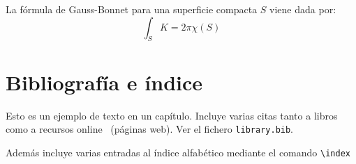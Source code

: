 La fórmula de Gauss-Bonnet para una superficie compacta $S$ viene dada por:
\begin{equation}
  \int_S K = 2\pi\chi(S)
\end{equation}


\section{Bibliografía e índice}

Esto es un ejemplo de texto en un capítulo. Incluye varias citas tanto a libros~\cite{Euler1982, Euler1984, Euler1985} como a recursos online~\cite{EulerWiki} (páginas web). Ver el fichero \texttt{library.bib}. 

Además incluye varias entradas al índice alfabético mediante el comando \verb+\index+ 


\endinput

